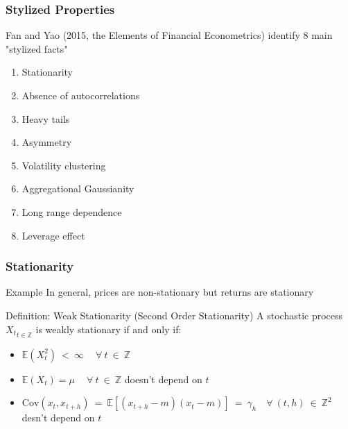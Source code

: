 \documentclass{beamer}
\begin{document}
\begin{frame}
  \frametitle{Stylized Properties}

  Fan and Yao (2015, the Elements of Financial Econometrics) identify 8 main "stylized facts"
  
  \begin{enumerate}
  \item Stationarity
  \item Absence of autocorrelations
  \item Heavy tails
  \item Asymmetry
  \item Volatility clustering
  \item Aggregational Gaussianity
  \item Long range dependence
  \item Leverage effect
  \end{enumerate}
  
\end{frame}



\begin{frame}
  \frametitle{Stationarity}
  \begin{exampleblock}{Example}
   In general, prices are non-stationary but returns are stationary 
 \end{exampleblock}

 \begin{block}{Definition: Weak Stationarity (Second Order Stationarity)}
   A stochastic process ${X_t}_{t \in \mathbb{Z}}$ is weakly stationary if and only if:

   \begin{itemize}
   \item $\mathbb{E}(X^2_t) \ < \ \infty \ \quad \forall \ t \ \in \ \mathbb{Z}$
   \item $\mathbb{E}(X_t) = \mu \ \quad \forall \ t \ \in \ \mathbb{Z}$ doesn't depend on $t$
   \item $\text{Cov}(x_t, x_{t+h}) \ = \ \mathbb{E}[(x_{t+h} - m)(x_t - m)] \ = \ \gamma_h \quad \forall \ (t, h) \ \in \ \mathbb{Z}^2$ desn't depend on $t$
   \end{itemize}
   
 \end{block}
 
\end{frame}
\end{document}
